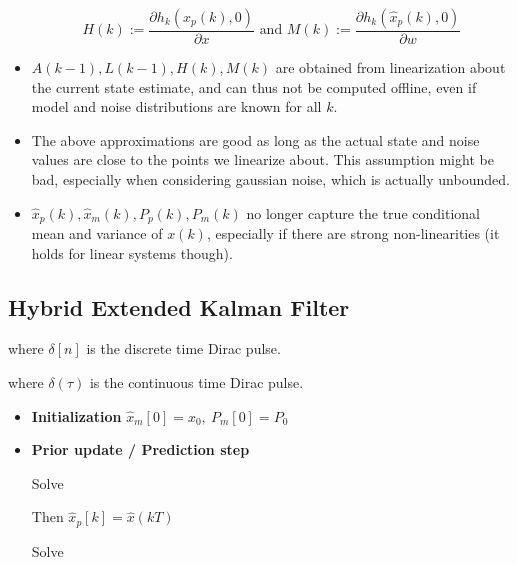 \documentclass[10pt,a4paper]{scrartcl}
\begin{document}
\begin{multicols*}{2}
\begin{itemize}
\begin{equation*}
H(k):=\frac{\partial h_k(\hat{x}_p(k),0)}{\partial x}\text{ and }M(k):=\frac{\partial h_k(\hat{x}_p(k),0)}{\partial w}
\end{equation*}
\item $A(k-1), L(k-1), H(k), M(k)$ are obtained from linearization about the current state estimate, and can thus not be computed offline, even if model and noise distributions are known for all $k$.
\item The above approximations are good as long as the actual state and noise values are close to the points we linearize about. This assumption might be bad, especially when considering gaussian noise, which is actually unbounded.
\item $\hat{x}_p(k),\hat{x}_m(k),P_p(k),P_m(k)$ no longer capture the true conditional mean and variance of $x(k)$, especially if there are strong non-linearities (it holds for linear systems though).
\end{itemize}

\subsection{Hybrid Extended Kalman Filter}


where $\delta[n]$ is the discrete time Dirac pulse.


where $\delta(\tau)$ is the continuous time Dirac pulse.

\begin{itemize}
\item \textbf{Initialization} $\hat{x}_m[0]=x_0,\ P_m[0]=P_0$
\item \textbf{Prior update / Prediction step}

Solve


Then $\hat{x}_p[k]=\hat{x}(kT)$

Solve



\end{itemize}
\end{multicols*}
\end{document}
